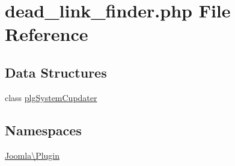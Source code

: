 \hypertarget{dead__link__finder_8php}{}\section{dead\+\_\+link\+\_\+finder.\+php File Reference}
\label{dead__link__finder_8php}
\subsection*{Data Structures}
\begin{DoxyCompactItemize}
\item 
class \mbox{\hyperlink{classplg_system_cupdater}{plg\+System\+Cupdater}}
\end{DoxyCompactItemize}
\subsection*{Namespaces}
\begin{DoxyCompactItemize}
\item 
 \mbox{\hyperlink{namespace_joomla_1_1_plugin}{Joomla\textbackslash{}\+Plugin}}
\end{DoxyCompactItemize}
